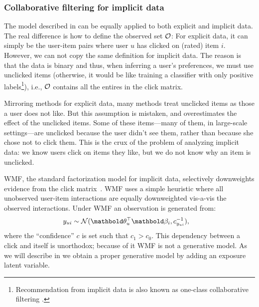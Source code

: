 \subsubsection{Collaborative filtering for implicit data} 
\label{chpt:background:sec:cf_implicit}

The model described in  can be equally applied to both explicit and implicit data. The real difference is how to define the observed set $\mathcal{O}$: For explicit data, it can simply be the user-item pairs where user $u$ has clicked on (rated) item $i$. However, we can not copy the same definition for implicit data. The reason is that the data is binary and thus, when inferring a user's preferences, we must use unclicked items (otherwise, it would be like training a classifier with only positive labels\footnote{Recommendation from implicit data is also known as one-class collaborative filtering \citep{pan2008one}.}), i.e., $\mathcal{O}$ contains all the entires in the click matrix. 

Mirroring methods for explicit data, many methods treat unclicked items as those a user does not like.  But this assumption is mistaken, and overestimates the effect of the unclicked items.  Some of these
items---many of them, in large-scale settings---are unclicked because
the user didn't see them, rather than because she chose not to
click them.  This is the crux of the problem of analyzing implicit
data: we know users click on items they like, but we do not know why
an item is unclicked.
	
\gls{WMF}, the standard factorization model for implicit
data, selectively downweights evidence from the click
matrix~\citep{hu2008collaborative}.  \gls{WMF} uses a simple heuristic where all
unobserved user-item interactions are equally downweighted vis-a-vis the
observed interactions. Under \gls{WMF} an observation is generated from:
\begin{align*} 
y_{ui} &\sim \mathcal{N}(\mb\theta_u^\top\mb\beta_i, c^{-1}_{y_{ui}}),
\end{align*}
where the ``confidence'' $c$ is set such that $c_1 > c_0$. This dependency between a
click and itself is unorthodox; because of it \gls{WMF} is not a generative
model. As we will describe in  we obtain a proper generative
model by adding an exposure latent variable. 

